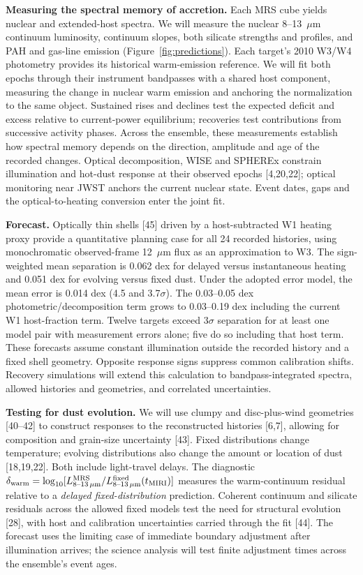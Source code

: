 \documentclass[12pt]{article}
\begin{document}
\clearpage
\noindent\textbf{Measuring the spectral memory of accretion.}
Each MRS cube yields nuclear and extended-host spectra. We will measure the nuclear 8--13~$\mu$m continuum luminosity, continuum slopes, both silicate strengths and profiles, and PAH and gas-line emission (Figure~\ref{fig:predictions}). Each target's 2010 W3/W4 photometry provides its historical warm-emission reference. We will fit both epochs through their instrument bandpasses with a shared host component, measuring the change in nuclear warm emission and anchoring the normalization to the same object. Sustained rises and declines test the expected deficit and excess relative to current-power equilibrium; recoveries test contributions from successive activity phases. Across the ensemble, these measurements establish how spectral memory depends on the direction, amplitude and age of the recorded changes. Optical decomposition, WISE and SPHEREx constrain illumination and hot-dust response at their observed epochs [4,20,22]; optical monitoring near JWST anchors the current nuclear state. Event dates, gaps and the optical-to-heating conversion enter the joint fit.

\noindent\textbf{Forecast.} Optically thin shells [45] driven by a host-subtracted W1 heating proxy provide a quantitative planning case for all 24 recorded histories, using monochromatic observed-frame 12~$\mu$m flux as an approximation to W3. The sign-weighted mean separation is 0.062 dex for delayed versus instantaneous heating and 0.051 dex for evolving versus fixed dust. Under the adopted error model, the mean error is 0.014 dex (4.5 and 3.7$\sigma$). The 0.03--0.05 dex photometric/decomposition term grows to 0.03--0.19 dex including the current W1 host-fraction term. Twelve targets exceed $3\sigma$ separation for at least one model pair with measurement errors alone; five do so including that host term. These forecasts assume constant illumination outside the recorded history and a fixed shell geometry. Opposite response signs suppress common calibration shifts. Recovery simulations will extend this calculation to bandpass-integrated spectra, allowed histories and geometries, and correlated uncertainties.

\noindent\textbf{Testing for dust evolution.}
We will use clumpy and disc-plus-wind geometries [40--42] to construct responses to the reconstructed histories [6,7], allowing for composition and grain-size uncertainty [43]. Fixed distributions change temperature; evolving distributions also change the amount or location of dust [18,19,22]. Both include light-travel delays. The diagnostic $\delta_{\rm warm}=\log_{10}[L^{\rm MRS}_{8\text{--}13\,\mu{\rm m}}/L^{\rm fixed}_{8\text{--}13\,\mu{\rm m}}(t_{\rm MIRI})]$ measures the warm-continuum residual relative to a \emph{delayed fixed-distribution} prediction. Coherent continuum and silicate residuals across the allowed fixed models test the need for structural evolution [28], with host and calibration uncertainties carried through the fit [44]. The forecast uses the limiting case of immediate boundary adjustment after illumination arrives; the science analysis will test finite adjustment times across the ensemble's event ages.
\end{document}
